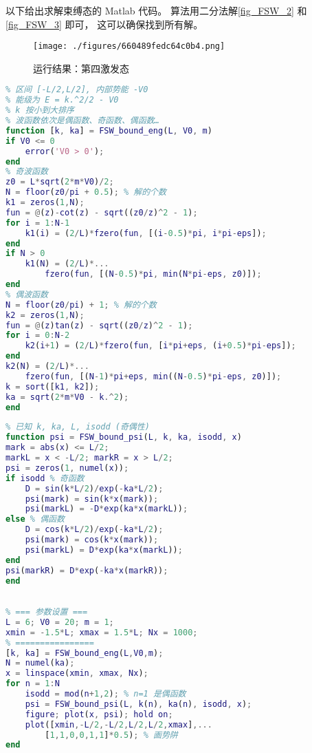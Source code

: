 

以下给出求解束缚态的 Matlab 代码。 算法用二分法解\autoref{fig_FSW_2}  和\autoref{fig_FSW_3}  即可， 这可以确保找到所有解。

\begin{figure}[ht]
\centering
\texttt{[image: ./figures/660489fedc64c0b4.png]}
\caption{运行结果：第四激发态} \label{fig_FSWmat_1}
\end{figure}

\begin{lstlisting}[language=matlab, caption=FSW\_bound\_eng.m]
% 计算有限深势阱的束缚态参数 k, ka
% 区间 [-L/2,L/2], 内部势能 -V0
% 能级为 E = k.^2/2 - V0
% k 按小到大排序
% 波函数依次是偶函数、奇函数、偶函数…
function [k, ka] = FSW_bound_eng(L, V0, m)
if V0 <= 0
    error('V0 > 0');
end
% 奇波函数
z0 = L*sqrt(2*m*V0)/2;
N = floor(z0/pi + 0.5); % 解的个数
k1 = zeros(1,N);
fun = @(z)-cot(z) - sqrt((z0/z)^2 - 1);
for i = 1:N-1
    k1(i) = (2/L)*fzero(fun, [(i-0.5)*pi, i*pi-eps]);
end
if N > 0
    k1(N) = (2/L)*...
        fzero(fun, [(N-0.5)*pi, min(N*pi-eps, z0)]);
end
% 偶波函数
N = floor(z0/pi) + 1; % 解的个数
k2 = zeros(1,N);
fun = @(z)tan(z) - sqrt((z0/z)^2 - 1);
for i = 0:N-2
    k2(i+1) = (2/L)*fzero(fun, [i*pi+eps, (i+0.5)*pi-eps]);
end
k2(N) = (2/L)*...
    fzero(fun, [(N-1)*pi+eps, min((N-0.5)*pi-eps, z0)]);
k = sort([k1, k2]);
ka = sqrt(2*m*V0 - k.^2);
end
\end{lstlisting}

\begin{lstlisting}[language=matlab, caption=FSW\_bound\_psi.m]
% 已知方势阱束缚态波函数的参数， 求波函数 psi(x)
% 已知 k, ka, L, isodd (奇偶性)
function psi = FSW_bound_psi(L, k, ka, isodd, x)
mark = abs(x) <= L/2;
markL = x < -L/2; markR = x > L/2;
psi = zeros(1, numel(x));
if isodd % 奇函数
    D = sin(k*L/2)/exp(-ka*L/2);
    psi(mark) = sin(k*x(mark));
    psi(markL) = -D*exp(ka*x(markL));
else % 偶函数
    D = cos(k*L/2)/exp(-ka*L/2);
    psi(mark) = cos(k*x(mark));
    psi(markL) = D*exp(ka*x(markL));
end
psi(markR) = D*exp(-ka*x(markR));
end
\end{lstlisting}

\begin{lstlisting}[language=matlab, caption=FSW\_bound\_plt.m]
% 有限深方势阱的波函数画图演示

% === 参数设置 ===
L = 6; V0 = 20; m = 1;
xmin = -1.5*L; xmax = 1.5*L; Nx = 1000;
% ================
[k, ka] = FSW_bound_eng(L,V0,m);
N = numel(ka);
x = linspace(xmin, xmax, Nx);
for n = 1:N
    isodd = mod(n+1,2); % n=1 是偶函数
    psi = FSW_bound_psi(L, k(n), ka(n), isodd, x);
    figure; plot(x, psi); hold on;
    plot([xmin,-L/2,-L/2,L/2,L/2,xmax],...
        [1,1,0,0,1,1]*0.5); % 画势阱
end
\end{lstlisting}
